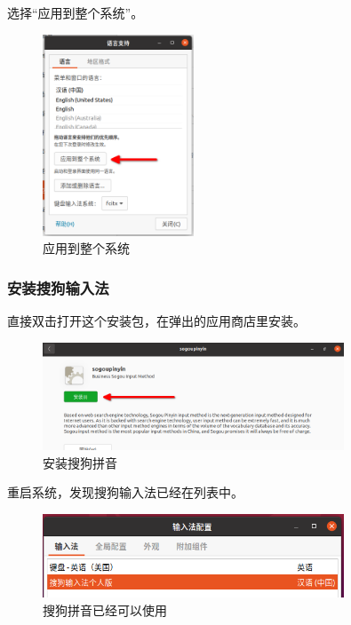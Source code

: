 \documentclass[UTF-8]{ctexart}
\begin{document}
				选择“应用到整个系统”。
				
				\begin{figure}[H]
					\centering
					\includegraphics[width=0.4\textwidth]{fig/apply_langs_settings.png}
					\caption*{应用到整个系统}
				\end{figure}
			
			\subsubsection{安装搜狗输入法}
			
				直接双击打开这个安装包，在弹出的应用商店里安装。
			
				\begin{figure}[H]
					\centering
					\includegraphics[width=0.8\textwidth]{fig/sogoupinyin_install.png}
					\caption*{安装搜狗拼音}
				\end{figure}
			
				重启系统，发现搜狗输入法已经在列表中。
				
				\begin{figure}[H]
					\centering
					\includegraphics[width=0.8\textwidth]{fig/add_sogou_success.png}
					\caption*{搜狗拼音已经可以使用}
				\end{figure}
			
\end{document}
